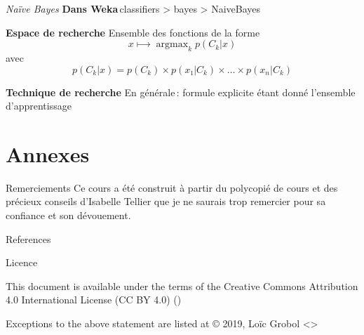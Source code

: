 \documentclass[hyperref={unicode}, xcolor={svgnames}, french]{beamer}
\DeclareMathOperator*\argmax{argmax}
\begin{document}
\begin{frame}{\emph{Naïve Bayes}}
    \textbf{Dans Weka} classifiers > bayes > NaiveBayes

    \textbf{Espace de recherche} Ensemble des fonctions de la forme
    \begin{equation}
        x ⟼ \argmax_k p(C_k | x)
    \end{equation}
    avec
    \begin{equation}
        p(C_k | x) = p(C_k) × p(x₁ | C_k) × … × p(x_n | C_k)
    \end{equation}

    \textbf{Technique de recherche} En générale : formule explicite étant donné l'ensemble d'apprentissage
\end{frame}



\appendix
{}  %
\section{Annexes}
\begin{frame}{Remerciements}
    Ce cours a été construit à partir du polycopié de cours  \parencite{tellier2017fouille} et des précieux conseils d'Isabelle Tellier que je ne saurais trop remercier pour sa confiance et son dévouement.
\end{frame}

\begin{frame}[allowframebreaks]{References}
    \printbibliography[heading=none]
\end{frame}

\begin{frame}{Licence}
    \begin{center}
        {\huge \ccby}
        \vfill
        This document is available under the terms of the Creative Commons Attribution 4.0 International License (CC BY 4.0) ()

        Exceptions to the above statement are listed at {\small{}}
        \vfill
        © 2019, Loïc Grobol <>

    \end{center}
\end{frame}
\end{document}
